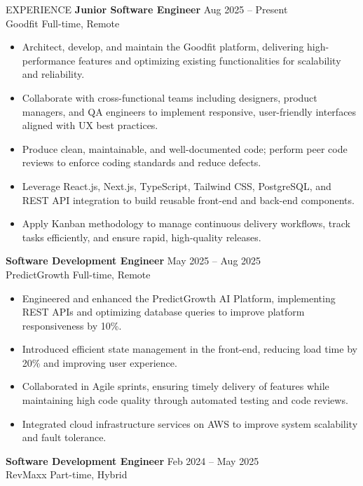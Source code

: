 \documentclass{resume}
\begin{document}
\vspace{-0.4em}
\begin{rSection}{EXPERIENCE}
	{\bf Junior Software Engineer} \hfill {Aug 2025 -- Present}\\
	Goodfit \hfill {Full-time, Remote}
	\vspace{-0.4em}
	\begin{itemize}
		\item{Architect, develop, and maintain the Goodfit platform, delivering high-performance features and optimizing existing functionalities for scalability and reliability.}
		\item{Collaborate with cross-functional teams including designers, product managers, and QA engineers to implement responsive, user-friendly interfaces aligned with UX best practices.}
		\item{Produce clean, maintainable, and well-documented code; perform peer code reviews to enforce coding standards and reduce defects.}
		\item{Leverage React.js, Next.js, TypeScript, Tailwind CSS, PostgreSQL, and REST API integration to build reusable front-end and back-end components.}
		\item{Apply Kanban methodology to manage continuous delivery workflows, track tasks efficiently, and ensure rapid, high-quality releases.}
	\end{itemize}
	{\bf Software Development Engineer} \hfill {May 2025 -- Aug 2025}\\
	PredictGrowth \hfill {Full-time, Remote}
	\vspace{-0.4em}
	\begin{itemize}
		\item{Engineered and enhanced the PredictGrowth AI Platform, implementing REST APIs and optimizing database queries to improve platform responsiveness by 10\%.}
		\item{Introduced efficient state management in the front-end, reducing load time by 20\% and improving user experience.}
		\item{Collaborated in Agile sprints, ensuring timely delivery of features while maintaining high code quality through automated testing and code reviews.}
		\item{Integrated cloud infrastructure services on AWS to improve system scalability and fault tolerance.}
	\end{itemize}
	{\bf Software Development Engineer} \hfill {Feb 2024 -- May 2025}\\
	RevMaxx \hfill {Part-time, Hybrid}

\end{rSection}
\end{document}
